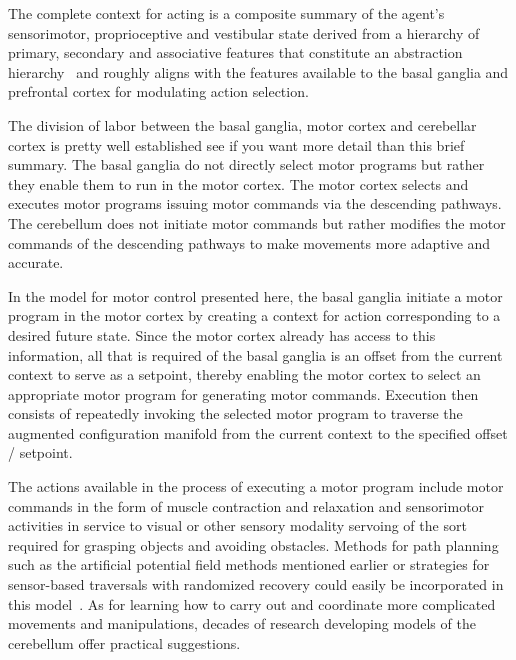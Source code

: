 The complete context for acting is a composite summary of the agent's sensorimotor, proprioceptive and vestibular state derived from a hierarchy of primary, secondary and associative features that constitute an abstraction hierarchy~\cite{FusterPREFRONTAL-CORTEX-15-CHAPTER_8} and roughly aligns with the features available to the basal ganglia and prefrontal cortex for modulating action selection.

The division of labor between the basal ganglia, motor cortex and cerebellar cortex is pretty well established {\emdash{}} see {} if you want more detail than this brief summary. The basal ganglia do not directly select motor programs but rather they enable them to run in the motor cortex. The motor cortex selects and executes motor programs issuing motor commands via the descending pathways. The cerebellum does not initiate motor commands but rather modifies the motor commands of the descending pathways to make movements more adaptive and accurate. 

In the model for motor control presented here, the basal ganglia initiate a motor program in the motor cortex by creating a context for action corresponding to a desired future state. Since the motor cortex already has access to this information, all that is required of the basal ganglia is an offset from the current context to serve as a setpoint, thereby enabling the motor cortex to select an appropriate motor program for generating motor commands. Execution then consists of repeatedly invoking the selected motor program to traverse the augmented configuration manifold from the current context to the specified offset / setpoint.

The actions available in the process of executing a motor program include motor commands in the form of muscle contraction and relaxation and sensorimotor activities in service to visual {\emdash{}} or other sensory modality {\emdash{}} servoing of the sort required for grasping objects and avoiding obstacles. Methods for path planning such as the artificial potential field methods mentioned earlier or strategies for sensor-based traversals with randomized recovery could easily be incorporated in this model~\cite{LiarokapisetalICAR-15}. As for learning how to carry out and coordinate more complicated movements and manipulations, decades of research developing models of the cerebellum offer practical suggestions.

